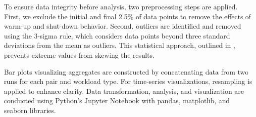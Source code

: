 To ensure data integrity before analysis, two preprocessing steps are applied. First, we exclude the initial and final 2.5\% of data points to remove the effects of warm-up and shut-down behavior. Second, outliers are identified and removed using the 3-sigma rule, which considers data points beyond three standard deviations from the mean as outliers. This statistical approach, outlined in \cite{}, prevents extreme values from skewing the results.

Bar plots visualizing aggregates are constructed by concatenating data from two runs for each pair and workload type. For time-series visualizations, resampling is applied to enhance clarity. Data transformation, analysis, and visualization are conducted using Python's Jupyter Notebook with pandas, matplotlib, and seaborn libraries.



